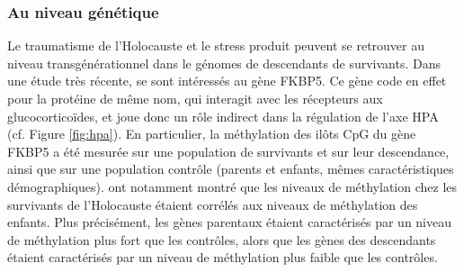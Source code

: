 \documentclass[french]{article}
\begin{document}
			\subsubsection{Au niveau génétique}
				Le traumatisme de l'Holocauste et le stress produit peuvent se retrouver au niveau transgénérationnel dans le génomes de descendants de survivants. Dans une étude très récente, \cite{yehuda2016} se sont intéressés au gène FKBP5. Ce gène code en effet pour la protéine de même nom, qui interagit avec les récepteurs aux glucocorticoïdes, et joue donc un rôle indirect dans la régulation de l'axe HPA (cf. Figure \ref{fig:hpa}). En particulier, la méthylation des ilôts CpG du gène FKBP5 a été mesurée sur une population de survivants et sur leur descendance, ainsi que sur une population contrôle (parents et enfants, mêmes caractéristiques démographiques). \cite{yehuda2016} ont notamment montré que les niveaux de méthylation chez les survivants de l'Holocauste étaient corrélés aux niveaux de méthylation des enfants. Plus précisément, les gènes parentaux étaient caractérisés par un niveau de méthylation plus fort que les contrôles, alors que les gènes des descendants étaient caractérisés par un niveau de méthylation plus faible que les contrôles.\\
				
\end{document}
